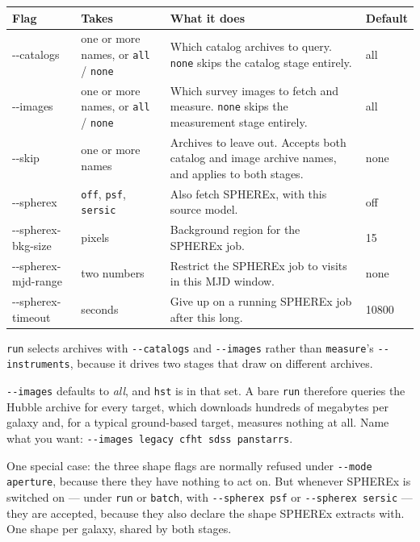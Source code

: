 \documentclass[11pt]{article}
\begin{document}
\begin{longtable}{T{2.9cm} L{2.15cm} L{6.45cm} L{2.7cm}}
\toprule
\textbf{\normalfont Flag} & \textbf{Takes} & \textbf{What it does} & \textbf{Default} \\
\midrule
\endhead
-{}-catalogs & one or more names, or \texttt{all} / \texttt{none} &
  Which catalog archives to query. \texttt{none} skips the catalog stage
  entirely. & all \\[2pt]
-{}-images & one or more names, or \texttt{all} / \texttt{none} & Which
  survey images to fetch and measure. \texttt{none} skips the measurement
  stage entirely. & all \\[2pt]
-{}-skip & one or more names & Archives to leave out. Accepts both catalog
  and image archive names, and applies to both stages. & none \\[2pt]
-{}-spherex & \texttt{off}, \texttt{psf}, \texttt{sersic} & Also fetch
  SPHEREx, with this source model. & off \\[2pt]
-{}-spherex-bkg-size & pixels & Background region for the SPHEREx job. & 15 \\[2pt]
-{}-spherex-mjd-range & two numbers & Restrict the SPHEREx job to visits in
  this MJD window. & none \\[2pt]
-{}-spherex-timeout & seconds & Give up on a running SPHEREx job after this
  long. & 10800 \\
\bottomrule
\end{longtable}

\texttt{run} selects archives with \texttt{-{}-catalogs} and
\texttt{-{}-images} rather than \texttt{measure}'s \texttt{-{}-instruments},
because it drives two stages that draw on different archives.

\begin{warnbox}
\texttt{-{}-images} defaults to \emph{all}, and \texttt{hst} is in that
set. A bare \texttt{run} therefore queries the Hubble archive for every
target, which downloads hundreds of megabytes per galaxy and, for a typical
ground-based target, measures nothing at all. Name what you want:
\texttt{-{}-images legacy cfht sdss panstarrs}.
\end{warnbox}

One special case: the three shape flags are normally refused under
\texttt{-{}-mode aperture}, because there they have nothing to act on. But
whenever SPHEREx is switched on --- under \texttt{run} or \texttt{batch},
with \texttt{-{}-spherex psf} or \texttt{-{}-spherex sersic} --- they are
accepted, because they also declare the shape SPHEREx extracts with. One
shape per galaxy, shared by both stages.
\end{document}
